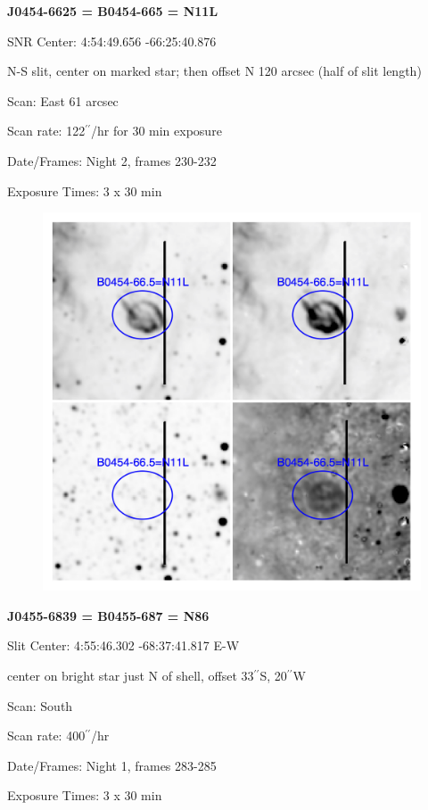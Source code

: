 \documentclass[11pt]{article}
\newcommand{\arcsec}{$^{\prime\prime}$}
\begin{document}
\newpage
{\bf J0454-6625 = B0454-665 = N11L}

SNR Center:   4:54:49.656   -66:25:40.876     

N-S slit, center on marked star; then offset N 120 arcsec (half of slit length)

Scan:  East  61 arcsec

Scan rate:  122\arcsec/hr for 30 min exposure

Date/Frames:  Night 2, frames 230-232

Exposure Times:  3 x 30 min

\begin{figure}
\includegraphics[width=12.5cm]{snapshots/N11L.png}
\end{figure}

\newpage
{\bf J0455-6839 = B0455-687 = N86}

Slit Center:   4:55:46.302    -68:37:41.817     E-W

center on bright star just N of shell, offset 33\arcsec S, 20\arcsec W

Scan:  South

Scan rate:  400\arcsec/hr

Date/Frames:  Night 1, frames 283-285

Exposure Times:  3 x 30 min
\end{document}
